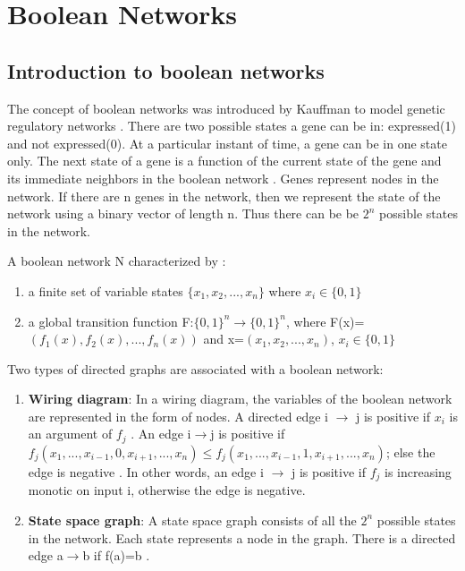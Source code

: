 \documentclass[11pt]{report}
\begin{document}
  \chapter{Boolean Networks}
  \section{\color{red} Introduction to boolean networks}
    The concept of boolean networks was introduced by Kauffman to model genetic regulatory networks \cite{Goles2010,Kauffman1969}.
    There are two possible states a gene can be in: expressed(1) and not expressed(0). At a particular instant of time, a gene can
    be in one state only. The next state of a gene is a function of the current state of the gene and its immediate neighbors
    in the boolean network \cite{Dimitrova2011}. Genes represent nodes in the network. If there are n genes in the network, then we represent the state of the network using a binary vector
    of length n. Thus there can be be $2^n$ possible states in the network.
    
    A boolean network N characterized by \cite{Goles2010}:
    \begin{enumerate}
     \item a finite set of variable states $\{x_{1},x_{2},...,x_{n}\}$ where $x_{i} \in \{0,1\}$
     \item a global transition function F:$\{0,1\}^{n} \to \{0,1\}^{n}$, where F(x)=$(f_{1}(x),f_{2}(x),...,f_{n}(x))$ and
     x=$(x_{1},x_{2},...,x_{n})$, $x_{i} \in \{0,1\}$
    \end{enumerate}
    
    Two types of directed graphs are associated with a boolean network:
    \begin {enumerate}
     \item \textbf{Wiring diagram}: In a wiring diagram, the variables of the boolean network are represented in the form of nodes.
     A directed edge i $\to$ j is positive if $x_{i}$ is an argument of $f_{j}$ \cite{Dimitrova2011}. An edge i$\to$j is positive if 
     $f_{j}(x_{1},...,x_{i-1},0,x_{i+1},...,x_{n}) \leq f_{j}(x_{1},...,x_{i-1},1,x_{i+1},...,x_{n})$; else the edge is negative \cite{Veliz-Cuba2011}.
     In other words, an edge i $\to$ j is positive if $f_{j}$ is increasing monotic \cite{Goles2010} on input i, otherwise the edge is negative.
     \item \textbf{State space graph}: A state space graph consists of all the $2^{n}$ possible states in the network. Each state 
     represents a node in the graph. There is a directed edge a$\to$b if f(a)=b \cite{Dimitrova2011}.
    \end {enumerate}
    
\end{document}
